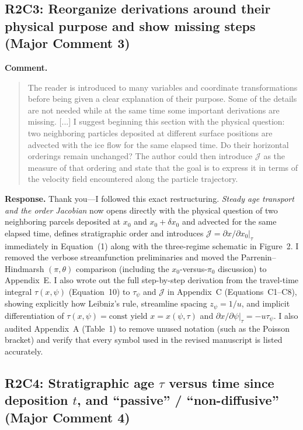 \documentclass[11pt]{article}
\newcommand{\response}[1]{\noindent\textcolor{responseblue}{#1}}
\begin{document}
\subsection*{R2C3: Reorganize derivations around their physical purpose and show missing steps (Major Comment 3)}

\noindent\textbf{Comment.}
\begin{quote}
The reader is introduced to many variables and coordinate transformations before being given a clear explanation of their purpose. Some of the details are not needed while at the same time some important derivations are missing. [...] I suggest beginning this section with the physical question: two neighboring particles deposited at different surface positions are advected with the ice flow for the same elapsed time. Do their horizontal orderings remain unchanged? The author could then introduce \(\mathcal{J}\) as the measure of that ordering and state that the goal is to express it in terms of the velocity field encountered along the particle trajectory.
\end{quote}

\response{\textbf{Response.} Thank you---I followed this exact restructuring. \emph{Steady age transport and the order Jacobian} now opens directly with the physical question of two neighboring parcels deposited at \(x_0\) and \(x_0+\delta x_0\) and advected for the same elapsed time, defines stratigraphic order and introduces \(\mathcal{J}=\left.\partial x/\partial x_0\right|_{\tau}\) immediately in Equation~(1) along with the three-regime schematic in Figure~2. I removed the verbose streamfunction preliminaries and moved the Parrenin--Hindmarsh \((\pi,\theta)\) comparison (including the \(x_0\)-versus-\(\pi_0\) discussion) to Appendix~E. I also wrote out the full step-by-step derivation from the travel-time integral \(\tau(x,\psi)\) (Equation~10) to \(\tau_\psi\) and \(\mathcal{J}\) in Appendix~C (Equations~C1--C8), showing explicitly how Leibniz's rule, streamline spacing \(z_\psi=1/u\), and implicit differentiation of \(\tau(x,\psi)=\text{const}\) yield \(x=x(\psi,\tau)\) and \(\left.\partial x/\partial\psi\right|_\tau=-u\tau_\psi\). I also audited Appendix~A (Table~1) to remove unused notation (such as the Poisson bracket) and verify that every symbol used in the revised manuscript is listed accurately.}

\subsection*{R2C4: Stratigraphic age \(\tau\) versus time since deposition \(t\), and ``passive'' / ``non-diffusive'' (Major Comment 4)}
\end{document}
